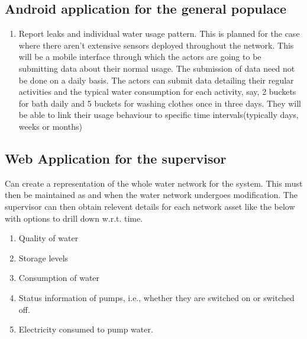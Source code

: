 \documentclass[paper=a4, fontsize=11pt]{scrartcl} %
\numberwithin{equation}{section} %
\numberwithin{figure}{section} %
\numberwithin{table}{section} %
\begin{document}
\subsection{Android application for the general populace}
\begin{enumerate}
\item
Report leaks and individual water usage pattern.
\newline
This is planned for the case where there aren't extensive sensors deployed throughout the network. This will be a mobile interface through which the actors are going to be submitting data about their normal usage. The submission of data need not be done on a daily basis. The actors can submit data detailing their regular activities and the typical water consumption for each activity, say, 2 buckets for bath daily and 5 buckets for washing clothes once in three days. They will be able to link their usage behaviour to specific time intervals(typically days, weeks or months)
\end{enumerate}

\subsection{Web Application for the supervisor}
Can create a representation of the whole water network for the system. This must then be maintained as and when the water network undergoes modification. The supervisor can then obtain relevent details for each network asset like the below with options to drill down w.r.t. time.
\begin{enumerate}
\item
Quality of water
\item
Storage levels
\item
Consumption of water
\item
Status information of pumps, i.e., whether they are switched on or switched off.
\item
Electricity consumed to pump water.
\end{enumerate}
\end{document}
